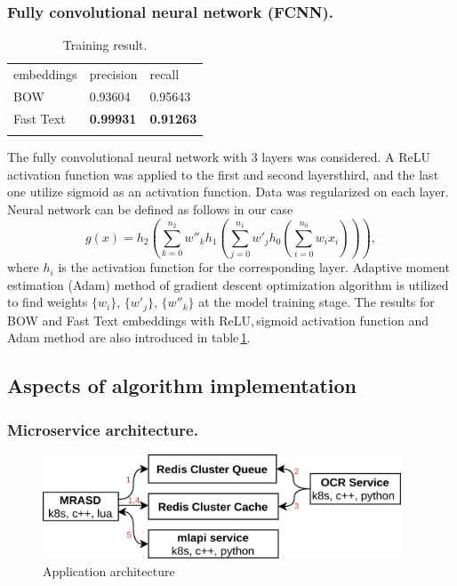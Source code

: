 \documentclass[12pt]{jpconf}
\begin{document}
\subsubsection*{Fully convolutional neural network (FCNN).}

\begin{table}[b]
	\centering
	\caption{\label{tbl:02}Training result.}
	\begin{center}
		\begin{tabular}{lll}
			\br
			embeddings & precision & recall \\
			\mr
			BOW & 0.93604 & 0.95643 \\ \hline
			Fast Text & \bf 0.99931 & \bf 0.91263 \\ 
			\br
		\end{tabular}
	\end{center}
\end{table}

The fully convolutional neural network with 3 layers was considered. A \textsf{ReLU} activation function was applied to the first and second layersthird, and the last one utilize \textsf{sigmoid} as an activation function. Data was regularized on each layer. Neural network can be defined as follows in our case
$$
g(x) = h_2 \left(\sum_{k=0}^{n_2} w''_k h_1\left(\sum_{j=0}^{n_1} w'_j h_0\left( \sum_{i=0}^{n_0} w_i x_i \right)\right)\right),
$$
where $h_i$ is the activation function for the corresponding layer. Adaptive moment estimation (Adam) method of gradient descent optimization algorithm is utilized to find weights $\{w_i\}$, $\{w'_j\}$, $\{w''_k\}$ at the model training stage.
The results for BOW and Fast Text embeddings with \textsf{ReLU},\,\textsf{sigmoid} activation function and Adam method are also introduced in table\,\ref{tbl:02}.


\subsection{Aspects of algorithm implementation}

\subsubsection*{Microservice architecture.}

\begin{figure}[t]
	\center
	\includegraphics[width=0.95\textwidth]{images/deploy.jpg}
	\caption{\label{fig:01} Application architecture}
\end{figure}
\end{document}
